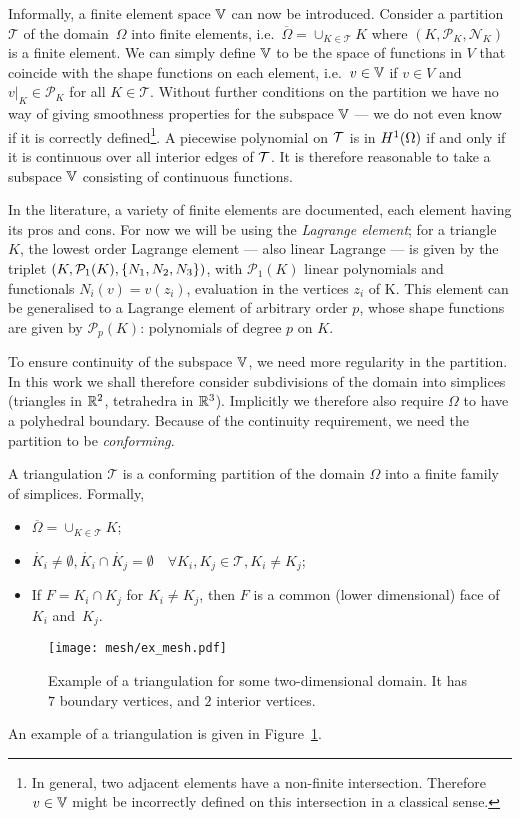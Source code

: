 \documentclass[thesis.tex]{subfiles}
\begin{document}
  Informally, a finite element space $\mathbb{V}$ can now be introduced. Consider a partition $\mathcal{T}$ of the domain~$\Omega$ into finite elements,
  i.e.~$\overline{\Omega} = \cup_{K \in \mathcal{T}} K$ where $(K, \mathcal{P}_K, \mathcal{N}_K)$ is a finite element.
  We can simply define $\mathbb{V}$ to be the space of functions in $V$ that coincide with the shape functions on each element,
  i.e.~$v \in \mathbb{V}$ if $v \in V$ and $v|_{K} \in \mathcal{P}_K$ for all $K \in \mathcal{T}$. 
  Without further conditions on the partition we have no way of giving smoothness  properties for the subspace $\mathbb{V}$ --- we do not even know if it is correctly defined\footnote{In general, two adjacent elements have a non-finite intersection. 
  Therefore $v \in \mathbb{V}$ might be incorrectly defined on this intersection in a classical sense.}.
  A piecewise polynomial on $\mathcal{T}$ is in $H^1(\Omega)$ if and only if it is continuous over all interior edges of $\mathcal{T}$.
  It is therefore reasonable to take a subspace $\mathbb{V}$ consisting
  of continuous functions.

  In the literature, a variety of finite elements are documented, 
  each element having its pros and cons. For now we will be using  the \emph{Lagrange element};
  for a triangle $K$, the lowest order Lagrange element  --- also linear Lagrange --- is given by the 
  triplet $(K, \mathcal{P}_1(K), \set{N_1, N_2, N_3})$, with $\mathcal{P}_1(K)$ linear polynomials and functionals $N_i(v) = v(z_i)$,
  evaluation in the vertices $z_i$ of K. This element can be generalised to a Lagrange element of arbitrary order $p$,
  whose shape functions are given by $\mathcal{P}_p(K)$: polynomials of degree $p$ on $K$.

  To ensure continuity of the subspace $\mathbb{V}$, we need more regularity in the partition. In this work  we shall therefore consider subdivisions of the domain into simplices (triangles in $\mathbb{R}^2$, tetrahedra in $\mathbb{R}^3$). Implicitly we therefore also require $\Omega$ to have a polyhedral boundary. Because of the continuity requirement, we need the partition to be \emph{conforming}.
  \begin{defn}
    A triangulation $\mathcal{T}$ is a conforming partition of the domain $\Omega$ into a finite family of simplices.
    Formally,
    \begin{itemize}
      \item $\overline{\Omega} = \cup_{K \in \mathcal{T}} K$;
      \item $\mathring{K_i} \ne \emptyset, \mathring{K_i} \cap \mathring{K_j} = \emptyset \quad \forall K_i, K_j \in \mathcal{T}, K_i \ne K_j$;
    \item If $F = K_i \cap K_j$ for $K_i \ne K_j$, then $F$ is a common (lower dimensional) face of $K_i$ and~$K_j$.
  \end{itemize}
  \end{defn}
  \begin{figure}
    \centering
    \texttt{[image: mesh/ex\_mesh.pdf]}
    \caption{Example of a triangulation for some two-dimensional domain. It has $7$ boundary vertices, and $2$ interior vertices.}
    \label{fig:triangulation}
  \end{figure} 
  An example of a triangulation is given in Figure~\ref{fig:triangulation}.
\end{document}
